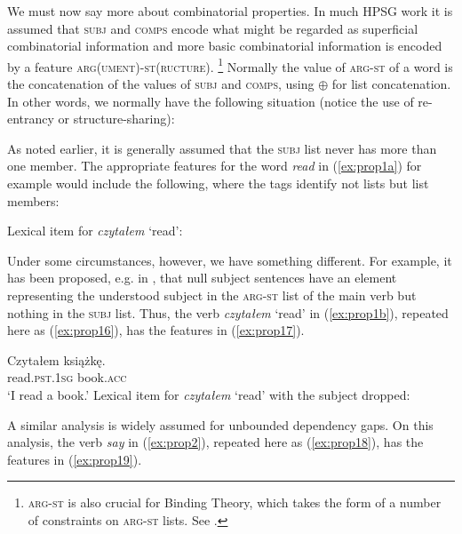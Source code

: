 \documentclass[output=paper
	        ,collection
	        ,collectionchapter
 	        ,biblatex
                ,babelshorthands
                ,newtxmath
                ,draftmode
                ,colorlinks, citecolor=brown
]{langscibook}
\begin{document}
We must now say more about combinatorial properties. In much HPSG work it is assumed that \textsc{subj} and \textsc{comps} encode what might be regarded as superficial combinatorial information and more basic combinatorial information is encoded by a feature \textsc{arg(ument)-st(ructure)}.%
%
\footnote{\textsc{arg-st} is also crucial for Binding Theory, which takes the form of a number of constraints on \textsc{arg-st} lists. See .}
%
Normally the value of \textsc{arg-st} of a word is the concatenation of the values of \textsc{subj} and \textsc{comps}, using $\oplus$ for list concatenation. In other words, we normally have the following situation (notice the use of re-entrancy or structure-sharing):

\ea\label{ex:prop14}
\z

As noted earlier, it is generally assumed that the \textsc{subj} list never has more than one member. The appropriate features for the word \emph{read} in (\ref{ex:prop1a}) for example would include the following, where the tags identify not lists but list members:

\eas
\label{ex:prop15}
Lexical item for \emph{czytałem} `read':\\
\zs

Under some circumstances, however, we have something different. For example, it has been proposed, e.g. in \citet[65]{MS99a}, that null subject sentences have an element representing the understood subject in the \textsc{arg-st} list of the main verb but nothing in the \textsc{subj} list. Thus, the verb \emph{czytałem} `read' in (\ref{ex:prop1b}), repeated here as (\ref{ex:prop16}), has the features in (\ref{ex:prop17}).

\ea\label{ex:prop16}
\gll Czytałem książkę.\\
read.\textsc{pst.1sg} book.\textsc{acc}\\
\glt `I read a book.'
\z
\ea\label{ex:prop17}
Lexical item for \emph{czytałem} `read' with the subject dropped:\\
\z

A similar analysis is widely assumed for unbounded dependency gaps. On this analysis, the verb \emph{say} in (\ref{ex:prop2}), repeated here as (\ref{ex:prop18}), has the features in (\ref{ex:prop19}).
\end{document}
